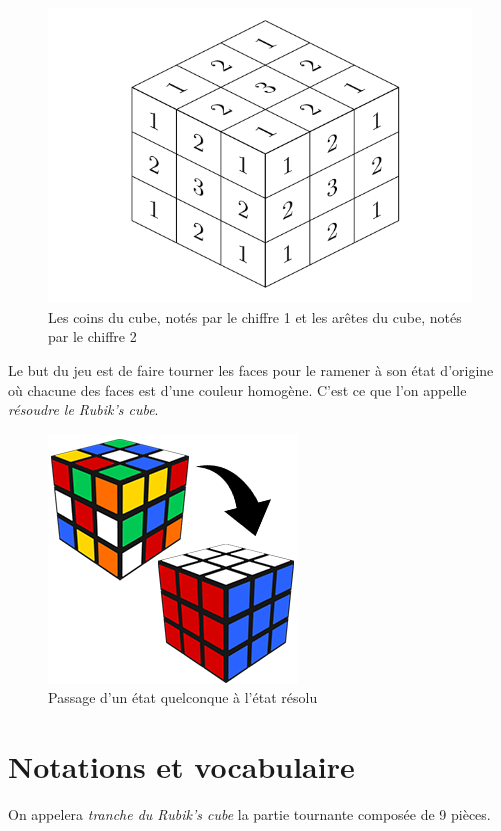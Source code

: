 \documentclass[french]{report}
\begin{document}
\begin{figure}[h!]
  \centering
  \includegraphics[scale=0.3]{figures/cube_parties_fixes_mobiles.png}
  \caption{Les coins du cube, notés par le chiffre 1 et les arêtes du cube, notés par le chiffre 2}
\end{figure}
Le but du jeu est de faire tourner les faces pour le ramener à son état d'origine où chacune des faces est d'une couleur homogène. C'est ce que l'on appelle \emph{résoudre le Rubik's cube}.


\begin{figure}[h!]
  \centering
  \includegraphics[scale=0.5]{figures/non-resolu.png}
  \caption{Passage d'un état quelconque à l'état résolu}
  \label{}
\end{figure}

\section*{Notations et vocabulaire}

On appelera \emph{tranche du Rubik's cube} la partie tournante composée de 9 pièces.
\end{document}
